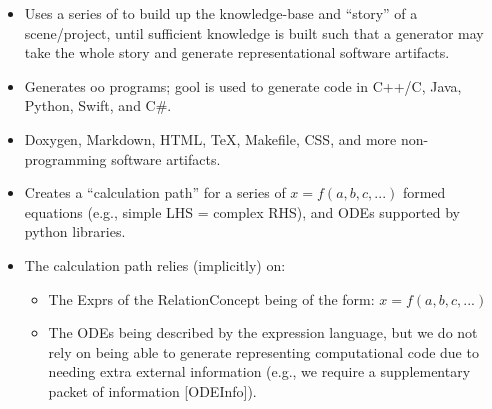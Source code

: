 \begin{itemize}

      \item Uses a series of  to build up the knowledge-base and
            ``story'' of a scene/project, until sufficient knowledge is built
            such that a generator may take the whole story and generate
            representational software artifacts.

      \item Generates \acs{oo} programs; \acs{gool} is used to generate code in
            C++/C, Java, Python, Swift, and C\#.

      \item Doxygen, Markdown, HTML, TeX, Makefile, CSS, and more
            non-programming software artifacts.

      \item Creates a ``calculation path'' for a series of $x = f(a,b,c,...)$
            formed equations (e.g., simple LHS = complex RHS), and ODEs
            supported by python libraries.

      \item The calculation path relies (implicitly) on:
            \begin{itemize}

                  \item The Exprs of the RelationConcept being of the form: $x =
                              f(a,b,c,...)$

                  \item The ODEs being described by the expression language, but
                        we do not rely on being able to generate representing
                        computational code due to needing extra external
                        information (e.g., we require a supplementary packet of
                        information [ODEInfo]).

            \end{itemize}

\end{itemize}
